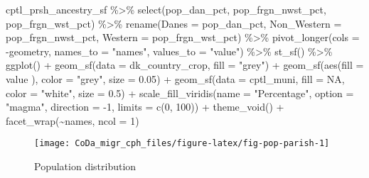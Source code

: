 \documentclass[
  12pt,
]{article}
\newenvironment{Shaded}{\begin{snugshade}}{\end{snugshade}}
\newcommand{\AttributeTok}[1]{\textcolor[rgb]{0.77,0.63,0.00}{#1}}
\newcommand{\ConstantTok}[1]{\textcolor[rgb]{0.00,0.00,0.00}{#1}}
\newcommand{\DecValTok}[1]{\textcolor[rgb]{0.00,0.00,0.81}{#1}}
\newcommand{\FloatTok}[1]{\textcolor[rgb]{0.00,0.00,0.81}{#1}}
\newcommand{\FunctionTok}[1]{\textcolor[rgb]{0.00,0.00,0.00}{#1}}
\newcommand{\NormalTok}[1]{#1}
\newcommand{\SpecialCharTok}[1]{\textcolor[rgb]{0.00,0.00,0.00}{#1}}
\newcommand{\StringTok}[1]{\textcolor[rgb]{0.31,0.60,0.02}{#1}}
\begin{document}
\begin{Shaded}
\begin{Highlighting}[]
\NormalTok{cptl\_prsh\_ancestry\_sf }\SpecialCharTok{\%\textgreater{}\%}
  \FunctionTok{select}\NormalTok{(pop\_dan\_pct, pop\_frgn\_nwst\_pct, pop\_frgn\_wst\_pct) }\SpecialCharTok{\%\textgreater{}\%}
  \FunctionTok{rename}\NormalTok{(}\AttributeTok{Danes =}\NormalTok{ pop\_dan\_pct,}
         \AttributeTok{Non\_Western =}\NormalTok{ pop\_frgn\_nwst\_pct,}
         \AttributeTok{Western =}\NormalTok{ pop\_frgn\_wst\_pct) }\SpecialCharTok{\%\textgreater{}\%} 
  \FunctionTok{pivot\_longer}\NormalTok{(}\AttributeTok{cols =} \SpecialCharTok{{-}}\NormalTok{geometry,}
               \AttributeTok{names\_to =} \StringTok{"names"}\NormalTok{,}
               \AttributeTok{values\_to =} \StringTok{"value"}\NormalTok{) }\SpecialCharTok{\%\textgreater{}\%}
  \FunctionTok{st\_sf}\NormalTok{() }\SpecialCharTok{\%\textgreater{}\%} 
  \FunctionTok{ggplot}\NormalTok{() }\SpecialCharTok{+}
  \FunctionTok{geom\_sf}\NormalTok{(}\AttributeTok{data =}\NormalTok{ dk\_country\_crop, }\AttributeTok{fill =} \StringTok{"grey"}\NormalTok{) }\SpecialCharTok{+}  
  \FunctionTok{geom\_sf}\NormalTok{(}\FunctionTok{aes}\NormalTok{(}\AttributeTok{fill =}\NormalTok{ value ), }\AttributeTok{color =} \StringTok{"grey"}\NormalTok{, }\AttributeTok{size =} \FloatTok{0.05}\NormalTok{) }\SpecialCharTok{+}
  \FunctionTok{geom\_sf}\NormalTok{(}\AttributeTok{data =}\NormalTok{ cptl\_muni, }\AttributeTok{fill =} \ConstantTok{NA}\NormalTok{, }\AttributeTok{color =} \StringTok{"white"}\NormalTok{, }\AttributeTok{size =} \FloatTok{0.5}\NormalTok{) }\SpecialCharTok{+}
  \FunctionTok{scale\_fill\_viridis}\NormalTok{(}\AttributeTok{name =} \StringTok{"Percentage"}\NormalTok{,}
                     \AttributeTok{option =} \StringTok{"magma"}\NormalTok{,}
                     \AttributeTok{direction =} \SpecialCharTok{{-}}\DecValTok{1}\NormalTok{, }
                     \AttributeTok{limits =} \FunctionTok{c}\NormalTok{(}\DecValTok{0}\NormalTok{, }\DecValTok{100}\NormalTok{)) }\SpecialCharTok{+}
  \FunctionTok{theme\_void}\NormalTok{() }\SpecialCharTok{+}
  \FunctionTok{facet\_wrap}\NormalTok{(}\SpecialCharTok{\textasciitilde{}}\NormalTok{names, }\AttributeTok{ncol =} \DecValTok{1}\NormalTok{)}
\end{Highlighting}
\end{Shaded}

\begin{figure}[H]

{\centering \texttt{[image: CoDa\_migr\_cph\_files/figure-latex/fig-pop-parish-1]} 

}

\caption{Population distribution}\label{fig:fig-pop-parish}
\end{figure}
\end{document}
